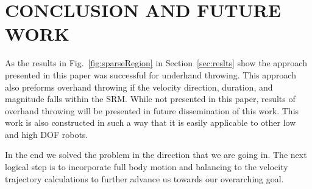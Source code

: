 \section{CONCLUSION AND FUTURE WORK}\label{sec:conc}

As the results in Fig.~\ref{fig:sparseRegion} in Section~\ref{sec:reslts} show the approach presented in this paper was successful for underhand throwing.  This approach also preforms overhand throwing if the velocity direction, duration, and magnitude falls within the SRM.  While not presented in this paper, results of overhand throwing will be presented in future dissemination of this work.  This work is also constructed in such a way that it is easily applicable to other low and high DOF robots.

In the end we solved the problem in the direction that we are going in.  The next logical step is to incorporate full body motion and balancing to the velocity trajectory calculations to further advance us towards our overarching goal.


